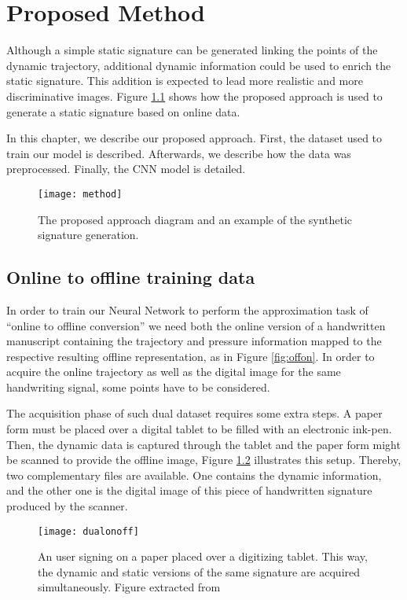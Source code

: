 
\chapter{Proposed Method}\label{ch:method}


Although a simple static signature can be generated linking the points of the dynamic trajectory, additional dynamic information could be used to enrich the static signature. This addition is expected to lead more realistic and more discriminative images. Figure \ref{fig_approach} shows how the proposed approach is used to generate a static signature based on online data. 

In this chapter, we describe our proposed approach. First, the dataset used to train our model is described. Afterwards, we describe how the data was preprocessed. Finally, the CNN model is detailed. 

\begin{figure}[!htb]
\centering
\texttt{[image: method]}
\caption{The proposed approach diagram and an example of the synthetic signature generation.}
\label{fig_approach}
\end{figure}

\section{Online to offline training data}
In order to train our Neural Network to perform the approximation task of ``online to offline conversion'' we need both the online version of a handwritten manuscript containing the trajectory and pressure information mapped to the respective resulting offline representation, as in Figure \ref{fig:offon}. In order to acquire the online trajectory as well as the digital image for the same handwriting signal, some points have to be considered.

The acquisition phase of such dual dataset requires some extra steps. A paper form must be placed over a digital tablet to be filled with an electronic ink-pen. Then, the dynamic data is captured through the tablet and the paper form might be scanned to provide the offline image, Figure \ref{fig:dualonoff} illustrates this setup. Thereby, two complementary files are available. One contains the dynamic information, and the other one is the digital image of this piece of handwritten signature produced by the scanner. 
\begin{figure}[!htb]
\centering
\texttt{[image: dualonoff]}

\caption{An user signing on a paper placed over a digitizing tablet. This way, the dynamic and static versions of the same signature are acquired simultaneously. Figure extracted from \cite{galbally2015line}}
\label{fig:dualonoff}
\end{figure}

